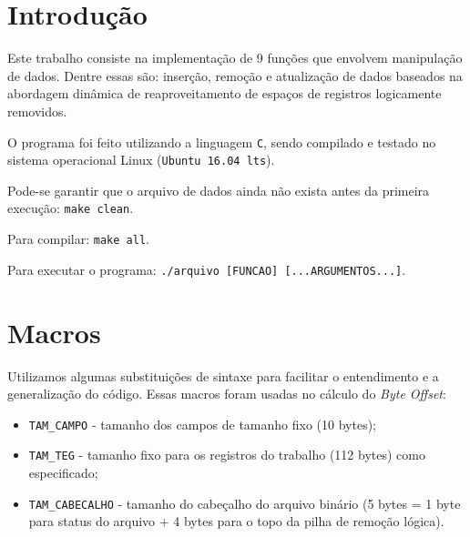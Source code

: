 \documentclass[
	12pt,				%
	openany,			%
	twoside,			%
	a4paper,			%
	english,			%
	french,				%
	spanish,			%
	brazil,				%
	]{abntex2}
\begin{document}

\frenchspacing 


\imprimircapa


\tableofcontents*
\cleardoublepage


\textual

\section{Introdução}

Este trabalho consiste na implementação de 9 funções que envolvem manipulação de dados. Dentre essas são: inserção, remoção e atualização de dados baseados na abordagem dinâmica de reaproveitamento de espaços de registros logicamente removidos.

O programa foi feito utilizando a linguagem \verb|C|, sendo compilado e testado no sistema operacional Linux (\verb|Ubuntu 16.04 lts|).

Pode-se garantir que o arquivo de dados ainda não exista antes da primeira execução: \verb|make clean|.

Para compilar: \verb|make all|.

Para executar o programa: \verb|./arquivo [FUNCAO] [...ARGUMENTOS...]|.


\section{Macros}
    Utilizamos algumas substituições de sintaxe para facilitar o entendimento e a generalização do código. Essas macros foram usadas no cálculo do \textit{Byte Offset}:
    \begin{itemize}
    \item \verb|TAM_CAMPO| - tamanho dos campos de tamanho fixo (10 bytes);
    \item \verb|TAM_TEG| - tamanho fixo para os registros do trabalho (112 bytes) como especificado;
    \item \verb|TAM_CABECALHO| - tamanho do cabeçalho do arquivo binário (5 bytes = 1 byte para status do arquivo + 4 bytes para o topo da pilha de remoção lógica).
    \end{itemize}
\end{document}
